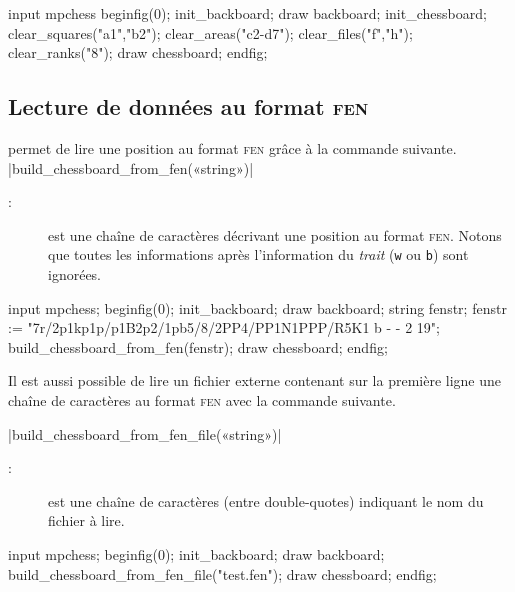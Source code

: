 \documentclass[french]{ltxdoc}
\begin{document}
\begin{ExempleMP}
input mpchess
beginfig(0);
init_backboard;
draw backboard;
init_chessboard;
clear_squares("a1","b2");
clear_areas("c2-d7");
clear_files("f","h");
clear_ranks("8");
draw chessboard;
endfig;
\end{ExempleMP}



\subsection{Lecture de données au format \textsc{fen}}

\mpchess permet de lire une position au format \textsc{fen} grâce à la commande suivante.
\commande|build_chessboard_from_fen(«string»)|\smallskip

\begin{description}
\item[:] est une chaîne de caractères décrivant une position au
format \textsc{fen}. Notons que toutes les informations après l’information du
\emph{trait} (\texttt{w} ou \texttt{b}) sont ignorées.
\end{description}

\begin{ExempleMP}
input mpchess;
beginfig(0);
init_backboard;
draw backboard;
string fenstr;
fenstr := "7r/2p1kp1p/p1B2p2/1pb5/8/2PP4/PP1N1PPP/R5K1 b - - 2 19";
build_chessboard_from_fen(fenstr);
draw chessboard;
endfig;
\end{ExempleMP}

Il est aussi possible de lire un fichier externe contenant sur la première ligne
une chaîne de caractères au format \textsc{fen} avec la commande suivante. 

\commande|build_chessboard_from_fen_file(«string»)|\smallskip

\begin{description}
\item[:] est une chaîne de caractères (entre double-quotes)
indiquant le nom du fichier à lire. 
\end{description}

\begin{ExempleMP}
input mpchess;
beginfig(0);
init_backboard;
draw backboard;
build_chessboard_from_fen_file("test.fen");
draw chessboard;
endfig;
\end{ExempleMP}
\end{document}
